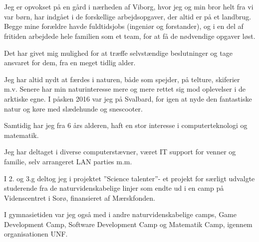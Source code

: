 \\



\\
Jeg er opvokset på en gård i nærheden af Viborg, hvor jeg og min bror helt fra vi var børn, har indgået i de forskellige arbejdsopgaver, der altid er på et landbrug. Begge mine forældre havde fuldtidsjobs (ingeniør og forstander), og i en del af fritiden arbejdede hele familien som et team, for at få de nødvendige opgaver løst. 

Det har givet mig mulighed for at træffe selvstændige beslutninger og tage ansvaret for dem, fra en meget tidlig alder. 

Jeg har altid nydt at færdes i naturen, både som spejder, på telture, skiferier m.v. 
Senere har min naturinteresse mere og mere rettet sig mod oplevelser i de arktiske egne. 
I påsken 2016 var jeg på Svalbard, for igen at nyde den fantastiske natur og køre med slædehunde og snescooter.  

Samtidig har jeg fra 6 års alderen, haft en stor interesse i computerteknologi og matematik. 

Jeg har deltaget i diverse computerstævner, været IT support for venner og familie, selv arrangeret LAN parties m.m. 

I 2. og 3.g deltog jeg i projektet ”Science talenter”- et projekt for særligt udvalgte studerende fra de naturvidenskabelige linjer som endte ud i en camp på Videnscentret i Sorø, finansieret af Mærskfonden. 

I gymnasietiden var jeg også med i andre naturvidenskabelige camps, Game Development Camp, Software Development Camp og Matematik Camp, igennem organisationen UNF. 
